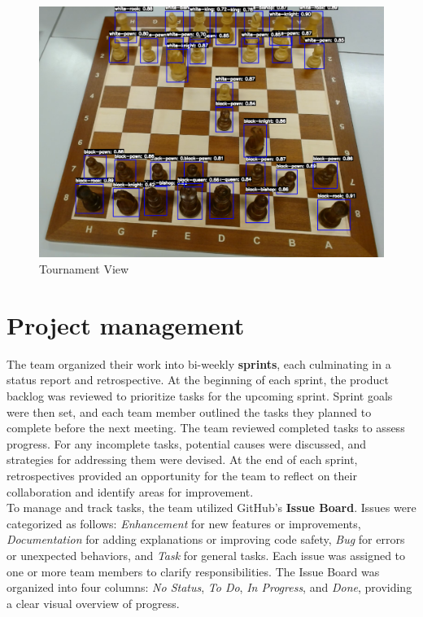\begin{subfigure}[h!]{0.9\linewidth} \centering \includegraphics[width=\linewidth]{figures/methods/ml-models/piece-model.png} \caption{Tournament View} \end{subfigure}

\newpage


\section{Project management}
\label{sec:project-management}

The team organized their work into bi-weekly \textbf{sprints}, each culminating in a status report and retrospective. At the beginning of each sprint, the product backlog was reviewed to prioritize tasks for the upcoming sprint. Sprint goals were then set, and each team member outlined the tasks they planned to complete before the next meeting. The team reviewed completed tasks to assess progress. For any incomplete tasks, potential causes were discussed, and strategies for addressing them were devised. At the end of each sprint, retrospectives provided an opportunity for the team to reflect on their collaboration and identify areas for improvement. \\

To manage and track tasks, the team utilized GitHub’s \textbf{Issue Board}. Issues were categorized as follows: \textit{Enhancement} for new features or improvements, \textit{Documentation} for adding explanations or improving code safety, \textit{Bug} for errors or unexpected behaviors, and \textit{Task} for general tasks. Each issue was assigned to one or more team members to clarify responsibilities. The Issue Board was organized into four columns: \textit{No Status}, \textit{To Do}, \textit{In Progress}, and \textit{Done}, providing a clear visual overview of progress. \\


